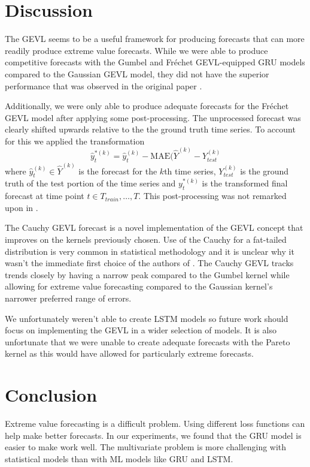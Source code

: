 \documentclass[conference]{IEEEtran}
\begin{document}
\section{Discussion}

The GEVL seems to be a useful framework for producing forecasts that can more readily produce extreme value forecasts. While we were able to produce competitive forecasts with the Gumbel and Fr\'echet GEVL-equipped GRU models compared to the Gaussian GEVL model, they did not have the superior performance that was observed in the original paper \cite{zhangEnhancingTimeSeries2021}. 

Additionally, we were only able to produce adequate forecasts for the Fr\'echet GEVL model after applying some post-processing. The unprocessed forecast was clearly shifted upwards relative to the the ground truth time series. To account for this we applied the transformation 
\[\hat{y}_t^{*(k)} = \hat{y}_t^{(k)} - \mathrm{MAE}(\hat{Y}^{(k)} - Y_{test}^{(k)}\] where $\hat{y}_t^{(k)} \in \hat{Y}^{(k)}$ is the forecast for the $k$th time series, $Y_{test}^{(k)}$ is the ground truth of the test portion of the time series and $y_t^{*(k)}$ is the transformed final forecast at time point $t \in T_{train}, \dots, T$. This post-processing was not remarked upon in \cite{zhangEnhancingTimeSeries2021}.

The Cauchy GEVL forecast is a novel implementation of the GEVL concept that improves on the kernels previously chosen. Use of the Cauchy for a fat-tailed distribution is very common in statistical methodology and it is unclear why it wasn't the immediate first choice of the authors of \cite{zhangEnhancingTimeSeries2021}. The Cauchy GEVL tracks trends closely by having a narrow peak compared to the Gumbel kernel while allowing for extreme value forecasting compared to the Gaussian kernel's narrower preferred range of errors. 

We unfortunately weren't able to create LSTM models so future work should focus on implementing the GEVL in a wider selection of models. It is also unfortunate that we were unable to create adequate forecasts with the Pareto kernel as this would have allowed for particularly extreme forecasts.

\section{Conclusion}

Extreme value forecasting is a difficult problem. Using different loss functions can help make better forecasts. In our experiments, we found that the GRU model is easier to make work well. The multivariate problem is more challenging with statistical models than with ML models like GRU and LSTM. 
\end{document}
